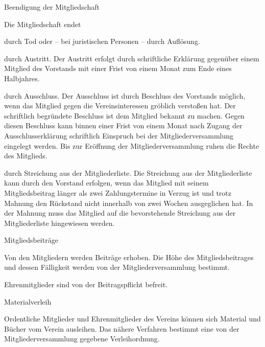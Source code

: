 \documentclass[11pt,a4paper,twoside,openany,article]{memoir}
\begin{document}
\begin{para}{Beendigung der Mitgliedschaft}
  \label{p:mitgliedschaftende}
  \item Die Mitgliedschaft endet
  \begin{subpara}
  \item durch Tod oder – bei juristischen Personen – durch Auflösung.
  \item durch Austritt.
  Der Austritt erfolgt durch schriftliche Erklärung gegenüber einem Mitglied des Vorstands mit einer Frist von einem Monat zum Ende eines Halbjahres.
  \item durch Ausschluss.
  Der Ausschluss ist durch Beschluss des Vorstands möglich, wenn das Mitglied gegen die Vereinsinteressen gröblich verstoßen hat. Der schriftlich begründete Beschluss ist dem Mitglied bekannt zu machen.
  Gegen diesen Beschluss kann binnen einer Frist von einem Monat nach Zugang der Ausschlusserklärung schriftlich Einspruch bei der Mitgliederversammlung eingelegt werden. Bis zur Eröffnung der Mitgliederversammlung ruhen die Rechte des Mitglieds.
  \item durch Streichung aus der Mitgliederliste.
  Die Streichung aus der Mitgliederliste kann durch den Vorstand erfolgen, wenn das Mitglied mit seinem Mitgliedsbeitrag länger als zwei Zahlungstermine in Verzug ist und trotz Mahnung den Rückstand nicht innerhalb von zwei Wochen ausgeglichen hat. In der Mahnung muss das Mitglied auf die bevorstehende Streichung aus der Mitgliederliste hingewiesen werden.
  \end{subpara}
\end{para}

\begin{para}{Mitgliedsbeiträge}
  \label{p:mitgliedsbeiträge}
  \item Von den Mitgliedern werden Beiträge erhoben. Die Höhe des Mitgliedsbeitrages und dessen Fälligkeit werden von der Mitgliederversammlung bestimmt.
  \item Ehrenmitglieder sind von der Beitragspflicht befreit.
\end{para}

\begin{para}{Materialverleih}
  \label{p:materialverleih}
  \item Ordentliche Mitglieder und Ehrenmitglieder des Vereins können sich Material und Bücher vom Verein ausleihen. Das nähere Verfahren bestimmt eine von der Mitgliederversammlung gegebene Verleihordnung.
\end{para}
\end{document}
